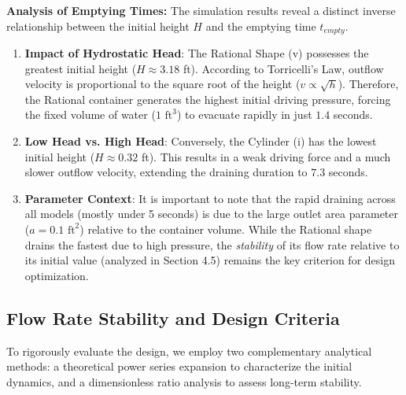 \documentclass[a4paper, 12pt]{article}
\begin{document}
\textbf{Analysis of Emptying Times:}
The simulation results reveal a distinct inverse relationship between the initial height $H$ and the emptying time $t_{empty}$.

\begin{enumerate}
    \item \textbf{Impact of Hydrostatic Head}: The Rational Shape (v) possesses the greatest initial height ($H \approx 3.18$ ft). According to Torricelli's Law, outflow velocity is proportional to the square root of the height ($v \propto \sqrt{h}$). Therefore, the Rational container generates the highest initial driving pressure, forcing the fixed volume of water ($1 \text{ ft}^3$) to evacuate rapidly in just $1.4$ seconds.
    
    \item \textbf{Low Head vs. High Head}: Conversely, the Cylinder (i) has the lowest initial height ($H \approx 0.32$ ft). This results in a weak driving force and a much slower outflow velocity, extending the draining duration to $7.3$ seconds.
    
    \item \textbf{Parameter Context}: It is important to note that the rapid draining across all models (mostly under 5 seconds) is due to the large outlet area parameter ($a=0.1 \text{ ft}^2$) relative to the container volume. While the Rational shape drains the fastest due to high pressure, the \textit{stability} of its flow rate relative to its initial value (analyzed in Section 4.5) remains the key criterion for design optimization.
\end{enumerate}

\subsection{Flow Rate Stability and Design Criteria}

To rigorously evaluate the design, we employ two complementary analytical methods: a theoretical power series expansion to characterize the initial dynamics, and a dimensionless ratio analysis to assess long-term stability.

\end{document}
